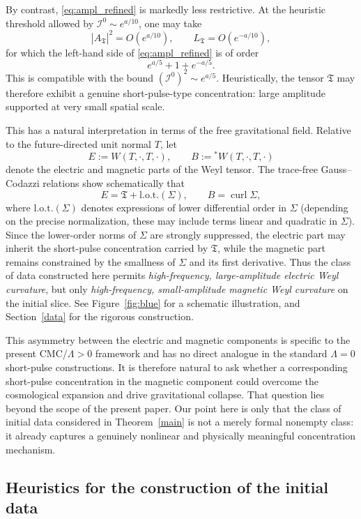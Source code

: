 \documentclass{amsart}
\begin{document}
\noindent By contrast, \eqref{eq:ampl_refined} is markedly less restrictive. At the heuristic threshold allowed by \(\mathcal I^{0}\sim e^{a/10}\), one may take
\[
|A_{\mathfrak T}|^{2}=O(e^{a/10}),
\qquad
L_{\mathfrak T}=O(e^{-a/10}),
\]
for which the left-hand side of \eqref{eq:ampl_refined} is of order
\[
e^{a/5}+1+e^{-a/5}.
\]
This is compatible with the bound \((\mathcal I^{0})^{2}\sim e^{a/5}\). Heuristically, the tensor \(\mathfrak T\) may therefore exhibit a genuine short-pulse-type concentration: large amplitude supported at very small spatial scale.

\noindent This has a natural interpretation in terms of the free gravitational field. Relative to the future-directed unit normal \(T\), let
\[
E:=W(T,\cdot,T,\cdot),\qquad
B:={}^{*}W(T,\cdot,T,\cdot)
\]
denote the electric and magnetic parts of the Weyl tensor. The trace-free Gauss--Codazzi relations show schematically that
\[
E=\mathfrak T+\mathrm{l.o.t.}(\Sigma),
\qquad
B=\operatorname{curl}\Sigma,
\]
where \(\mathrm{l.o.t.}(\Sigma)\) denotes expressions of lower differential order in \(\Sigma\) (depending on the precise normalization, these may include terms linear and quadratic in \(\Sigma\)). Since the lower-order norms of \(\Sigma\) are strongly suppressed, the electric part may inherit the short-pulse concentration carried by \(\mathfrak T\), while the magnetic part remains constrained by the smallness of \(\Sigma\) and its first derivative. Thus the class of data constructed here permits \emph{high-frequency, large-amplitude electric Weyl curvature}, but only \emph{high-frequency, small-amplitude magnetic Weyl curvature} on the initial slice. See Figure~\ref{fig:blue} for a schematic illustration, and Section~\ref{data} for the rigorous construction.

\noindent This asymmetry between the electric and magnetic components is specific to the present CMC/\(\Lambda>0\) framework and has no direct analogue in the standard \(\Lambda=0\) short-pulse constructions. It is therefore natural to ask whether a corresponding short-pulse concentration in the magnetic component could overcome the cosmological expansion and drive gravitational collapse. That question lies beyond the scope of the present paper. Our point here is only that the class of initial data considered in Theorem~\ref{main} is not a merely formal nonempty class: it already captures a genuinely nonlinear and physically meaningful concentration mechanism.

\subsection{Heuristics for the construction of the initial data}
\end{document}
